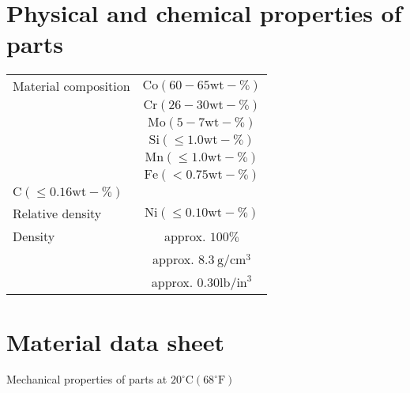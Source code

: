\documentclass[10pt]{article}
\begin{document}
\section*{Physical and chemical properties of parts}
\begin{center}
\begin{tabular}{lc}
\hline
Material composition & $\mathrm{Co}(60-65 \mathrm{wt}-\%)$ \\
 & $\mathrm{Cr}(26-30 \mathrm{wt}-\%)$ \\
 & $\mathrm{Mo}(5-7 \mathrm{wt}-\%)$ \\
 & $\mathrm{Si}(\leq 1.0 \mathrm{wt}-\%)$ \\
 & $\mathrm{Mn}(\leq 1.0 \mathrm{wt}-\%)$ \\
 & $\mathrm{Fe}(<0.75 \mathrm{wt}-\%)$ \\
$\mathrm{C}(\leq 0.16 \mathrm{wt}-\%)$ &  \\
Relative density & $\mathrm{Ni}(\leq 0.10 \mathrm{wt}-\%)$ \\
\hline
Density & approx. $100 \%$ \\
\hline
 & approx. $8.3 \mathrm{~g} / \mathrm{cm}^{3}$ \\
 & approx. $0.30 \mathrm{lb} / \mathrm{in}^{3}$ \\
\hline
\end{tabular}
\end{center}

\section*{Material data sheet}
Mechanical properties of parts at $20^{\circ} \mathrm{C}\left(68^{\circ} \mathrm{F}\right)$
\end{document}
